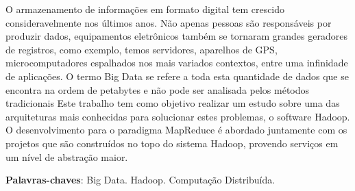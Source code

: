 \begin{resumo}

O armazenamento de informações em formato digital tem crescido consideravelmente nos últimos anos. Não apenas pessoas são responsáveis por produzir dados, equipamentos eletrônicos também se tornaram grandes geradores de registros, como exemplo, temos servidores, aparelhos de GPS, microcomputadores espalhados nos mais variados contextos, entre uma infinidade de aplicações. O termo Big Data se refere a toda esta quantidade de dados que se encontra na ordem de petabytes e não pode ser analisada pelos métodos tradicionais Este trabalho tem como objetivo realizar um estudo sobre uma das arquiteturas mais conhecidas para solucionar estes problemas, o software  Hadoop. O desenvolvimento para o paradigma MapReduce é abordado juntamente com os projetos que são construídos no topo do sistema Hadoop, provendo serviços em um nível de abstração maior.

 \vspace{\onelineskip}
    
 \noindent
 \textbf{Palavras-chaves}: Big Data. Hadoop. Computação Distribuída.
\end{resumo}
